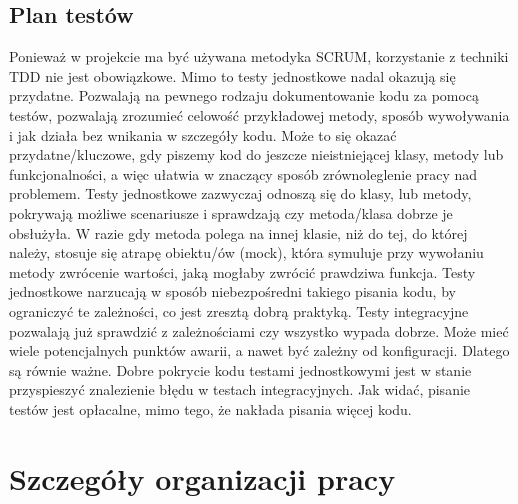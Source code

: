 \documentclass[10pt, titlepage, oneside, a4paper]{article}
\begin{document}
	\subsection{Plan testów}	
	Ponieważ w projekcie ma być używana metodyka SCRUM, korzystanie z techniki TDD nie jest obowiązkowe. Mimo to  testy jednostkowe nadal okazują się przydatne. Pozwalają na pewnego rodzaju dokumentowanie kodu za pomocą testów, pozwalają zrozumieć celowość przykładowej metody, sposób wywoływania i jak działa bez wnikania w szczegóły kodu. Może to się okazać przydatne/kluczowe, gdy piszemy kod do jeszcze nieistniejącej klasy, metody lub funkcjonalności, a więc ułatwia w znaczący sposób zrównoleglenie pracy nad problemem. Testy jednostkowe zazwyczaj odnoszą się do klasy, lub metody, pokrywają możliwe scenariusze i sprawdzają czy metoda/klasa dobrze je obsłużyła. W razie gdy metoda polega na innej klasie, niż do tej, do której należy, stosuje się atrapę obiektu/ów (mock), która symuluje przy wywołaniu metody zwrócenie wartości, jaką mogłaby zwrócić prawdziwa funkcja. Testy jednostkowe narzucają w sposób niebezpośredni takiego pisania kodu, by ograniczyć te zależności, co jest zresztą dobrą praktyką. Testy integracyjne pozwalają już sprawdzić z zależnościami czy wszystko wypada dobrze. Może mieć wiele potencjalnych punktów awarii, a nawet być zależny od konfiguracji. Dlatego są równie ważne. Dobre pokrycie kodu testami jednostkowymi jest w stanie przyspieszyć znalezienie błędu w testach integracyjnych. Jak widać, pisanie testów jest opłacalne, mimo tego, że nakłada pisania więcej kodu.
	\newpage 
 
	\section{Szczegóły organizacji pracy}  
 
\end{document}
